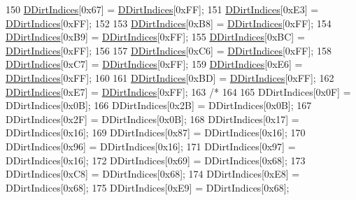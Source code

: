 \begin{DoxyCode}
150     \hyperlink{classCMapRenderer_a5916c26aa5bedf8367a8f3f7efb457bf}{DDirtIndices}[0x67] = \hyperlink{classCMapRenderer_a5916c26aa5bedf8367a8f3f7efb457bf}{DDirtIndices}[0xFF];
151     \hyperlink{classCMapRenderer_a5916c26aa5bedf8367a8f3f7efb457bf}{DDirtIndices}[0xE3] = \hyperlink{classCMapRenderer_a5916c26aa5bedf8367a8f3f7efb457bf}{DDirtIndices}[0xFF];
152     
153     \hyperlink{classCMapRenderer_a5916c26aa5bedf8367a8f3f7efb457bf}{DDirtIndices}[0xB8] = \hyperlink{classCMapRenderer_a5916c26aa5bedf8367a8f3f7efb457bf}{DDirtIndices}[0xFF];
154     \hyperlink{classCMapRenderer_a5916c26aa5bedf8367a8f3f7efb457bf}{DDirtIndices}[0xB9] = \hyperlink{classCMapRenderer_a5916c26aa5bedf8367a8f3f7efb457bf}{DDirtIndices}[0xFF];
155     \hyperlink{classCMapRenderer_a5916c26aa5bedf8367a8f3f7efb457bf}{DDirtIndices}[0xBC] = \hyperlink{classCMapRenderer_a5916c26aa5bedf8367a8f3f7efb457bf}{DDirtIndices}[0xFF];
156     
157     \hyperlink{classCMapRenderer_a5916c26aa5bedf8367a8f3f7efb457bf}{DDirtIndices}[0xC6] = \hyperlink{classCMapRenderer_a5916c26aa5bedf8367a8f3f7efb457bf}{DDirtIndices}[0xFF];
158     \hyperlink{classCMapRenderer_a5916c26aa5bedf8367a8f3f7efb457bf}{DDirtIndices}[0xC7] = \hyperlink{classCMapRenderer_a5916c26aa5bedf8367a8f3f7efb457bf}{DDirtIndices}[0xFF];
159     \hyperlink{classCMapRenderer_a5916c26aa5bedf8367a8f3f7efb457bf}{DDirtIndices}[0xE6] = \hyperlink{classCMapRenderer_a5916c26aa5bedf8367a8f3f7efb457bf}{DDirtIndices}[0xFF];
160     
161     \hyperlink{classCMapRenderer_a5916c26aa5bedf8367a8f3f7efb457bf}{DDirtIndices}[0xBD] = \hyperlink{classCMapRenderer_a5916c26aa5bedf8367a8f3f7efb457bf}{DDirtIndices}[0xFF];    
162     \hyperlink{classCMapRenderer_a5916c26aa5bedf8367a8f3f7efb457bf}{DDirtIndices}[0xE7] = \hyperlink{classCMapRenderer_a5916c26aa5bedf8367a8f3f7efb457bf}{DDirtIndices}[0xFF];
163     \textcolor{comment}{/*}
164 \textcolor{comment}{}
165 \textcolor{comment}{    DDirtIndices[0x0F] = DDirtIndices[0x0B];}
166 \textcolor{comment}{    DDirtIndices[0x2B] = DDirtIndices[0x0B];}
167 \textcolor{comment}{    DDirtIndices[0x2F] = DDirtIndices[0x0B];}
168 \textcolor{comment}{    DDirtIndices[0x17] = DDirtIndices[0x16];}
169 \textcolor{comment}{    DDirtIndices[0x87] = DDirtIndices[0x16];}
170 \textcolor{comment}{    DDirtIndices[0x96] = DDirtIndices[0x16];}
171 \textcolor{comment}{    DDirtIndices[0x97] = DDirtIndices[0x16];}
172 \textcolor{comment}{    DDirtIndices[0x69] = DDirtIndices[0x68];}
173 \textcolor{comment}{    DDirtIndices[0xC8] = DDirtIndices[0x68];}
174 \textcolor{comment}{    DDirtIndices[0xE8] = DDirtIndices[0x68];}
175 \textcolor{comment}{    DDirtIndices[0xE9] = DDirtIndices[0x68];}

\end{DoxyCode}
